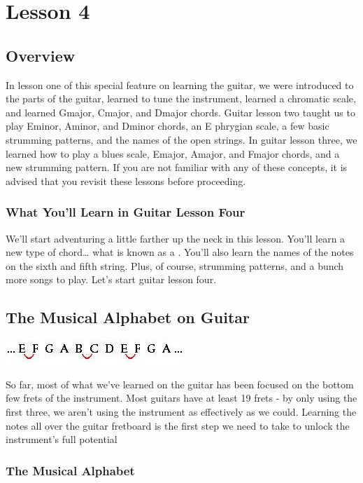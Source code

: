 \chapter{Lesson 4}
\section{Overview}
In lesson one of this special feature on learning the guitar, we were
introduced to the parts of the guitar, learned to tune the instrument, learned
a chromatic scale, and learned Gmajor, Cmajor, and Dmajor chords. Guitar lesson
two taught us to play Eminor, Aminor, and Dminor chords, an E phrygian scale, a
few basic strumming patterns, and the names of the open strings. In guitar
lesson three, we learned how to play a blues scale, Emajor, Amajor, and Fmajor
chords, and a new strumming pattern. If you are not familiar with any of these
concepts, it is advised that you revisit these lessons before proceeding.

\subsection{What You'll Learn in Guitar Lesson Four}

We'll start adventuring a little farther up the neck in this lesson. You'll
learn a new type of chord\ldots{} what is known as a . You'll also
learn the names of the notes on the sixth and fifth string. Plus, of course,
strumming patterns, and a bunch more songs to play. Let's start guitar lesson
four.

\section{The Musical Alphabet on Guitar}
\includegraphics{partfour/musalph.jpg}

So far, most of what we've learned on the guitar has been focused on the bottom
few frets of the instrument. Most guitars have at least 19 frets - by only
using the first three, we aren't using the instrument as effectively as we
could. Learning the notes all over the guitar fretboard is the first step we
need to take to unlock the instrument's full potential

\subsection{The Musical Alphabet}

